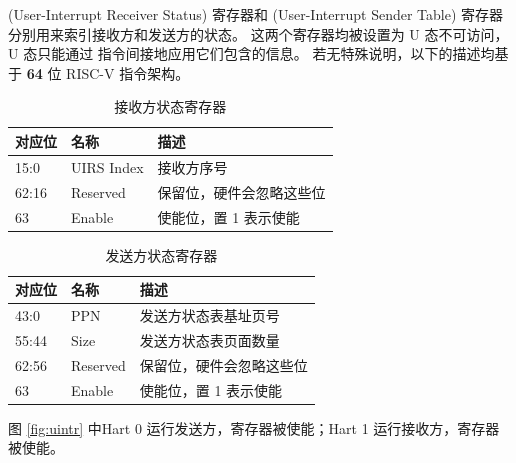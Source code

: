 \textbf{\Rsuirs}(User-Interrupt Receiver Status) 寄存器和 \textbf{\Rsuist}(User-Interrupt Sender Table) 寄存器分别用来索引接收方和发送方的状态。
这两个寄存器均被设置为 U 态不可访问，U 态只能通过 \Iuipi 指令间接地应用它们包含的信息。
若无特殊说明，以下的描述均基于 \textbf{64} 位 RISC-V 指令架构。

\begin{table}
    \centering
    \begin{threeparttable}[c]
        \begin{tabular}{|l|l|l|}
            \hline
            对应位 & 名称 & 描述 \\
            \hline
            15:0 & UIRS Index & 接收方序号 \\
            \hline
            62:16 & Reserved & 保留位，硬件会忽略这些位 \\
            \hline
            63 & Enable & 使能位，置 1 表示使能 \\
            \hline
        \end{tabular}
        \caption{接收方状态寄存器}
        \label{tab:suirs}
    \end{threeparttable}
\end{table}

\begin{table}
    \centering
    \begin{threeparttable}[c]
        \begin{tabular}{|l|l|l|}
            \hline
            对应位 & 名称 & 描述 \\
            \hline
            43:0 & PPN & 发送方状态表基址页号 \\
            \hline
            55:44 & Size & 发送方状态表页面数量 \\
            \hline
            62:56 & Reserved & 保留位，硬件会忽略这些位 \\
            \hline
            63 & Enable & 使能位，置 1 表示使能 \\
            \hline
        \end{tabular}
        \caption{发送方状态寄存器}
        \label{tab:suist}
    \end{threeparttable}
\end{table}

图 \ref{fig:uintr} 中Hart 0 运行发送方，\Rsuist 寄存器被使能；Hart 1 运行接收方，\Rsuirs 寄存器被使能。

